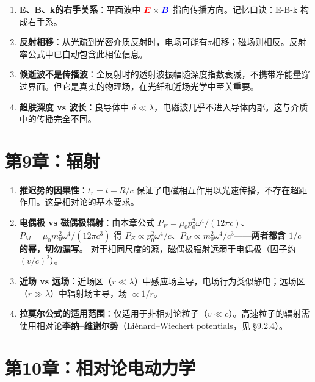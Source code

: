 \documentclass[11pt,a4paper,openany,oneside]{book}
\newcommand{\vecE}{\textcolor{red}{\vect{E}}}
\newcommand{\vecB}{\textcolor{blue}{\vect{B}}}
\newcommand{\muz}{\mu_0}
\newcommand{\vect}[1]{\bm{#1}}
\begin{document}
\begin{enumerate}
\item \textbf{E、B、k的右手关系}：平面波中 $\vecE\times\vecB$ 指向传播方向。记忆口诀：E-B-k 构成右手系。
\item \textbf{反射相移}：从光疏到光密介质反射时，电场可能有$\pi$相移；磁场则相反。反射率公式中已自动包含此相位信息。
\item \textbf{倏逝波不是传播波}：全反射时的透射波振幅随深度指数衰减，不携带净能量穿过界面。但它是真实的物理场，在光纤和近场光学中至关重要。
\item \textbf{趋肤深度 vs 波长}：良导体中 $\delta\ll\lambda$，电磁波几乎不进入导体内部。这与介质中的传播完全不同。
\end{enumerate}

\section{第9章：辐射}

\begin{enumerate}
\item \textbf{推迟势的因果性}：$t_r=t-R/c$ 保证了电磁相互作用以光速传播，不存在超距作用。这是相对论的基本要求。
\item \textbf{电偶极 vs 磁偶极辐射}：由本章公式 $P_E=\muz p_0^2\omega^4/(12\pi c)$、$P_M=\muz m_0^2\omega^4/(12\pi c^3)$ 得
  $P_E\propto p_0^2\omega^4/c$、$P_M\propto m_0^2\omega^4/c^3$——\textbf{两者都含 $1/c$ 的幂，切勿漏写}。
  对于相同尺度的源，磁偶极辐射远弱于电偶极（因子约 $(v/c)^2$）。
\item \textbf{近场 vs 远场}：近场区（$r\ll\lambda$）中感应场主导，电场行为类似静电；远场区（$r\gg\lambda$）中辐射场主导，场 $\propto 1/r$。
\item \textbf{拉莫尔公式的适用范围}：仅适用于非相对论粒子（$v\ll c$）。高速粒子的辐射需使用相对论\textbf{李纳--维谢尔势}（Liénard--Wiechert potentials，见 §9.2.4）。
\end{enumerate}

\section{第10章：相对论电动力学}
\end{document}
